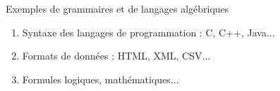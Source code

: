 \begin{frame}{Exemples de grammaires et de langages algébriques}
\begin{enumerate}
  \item Syntaxe des langages de programmation : C, C++, Java...\vspace{2mm}
    
  \item Formats de données : HTML, XML, CSV...\vspace{2mm}
    
  \item Formules logiques, mathématiques...
  \end{enumerate}

\end{frame}

\endgroup
